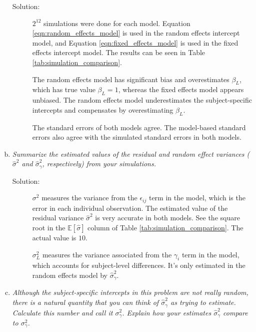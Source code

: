 \documentclass[11pt, letterpaper]{article}
\begin{document}
\begin{enumerate}[(a)]
  

  \begin{description}
  \item[Solution:] $2^{12}$ simulations were done for each model. Equation
    \ref{eqn:random_effects_model} is used in the random effects intercept
    model, and Equation \ref{eqn:fixed_effects_model} is used in the fixed
    effects intercept model. The results can be seen in Table
    \ref{tab:simulation_comparison}.

    The random effects model has significant bias and overestimates $\beta_L$,
    which has true value $\beta_L = 1$, whereas the fixed effects model appears
    unbiased. The random effects model underestimates the subject-specific
    intercepts and compensates by overestimating $\beta_L$.

    The standard errors of both models agree. The model-based standard errors
    also agree with the simulated standard errors in both models.   
  \end{description}
  

\item {\em  Summarize the estimated values of the residual and random effect variances ($\hat{\sigma}^2$ and $\hat{\sigma}^2_\gamma$, respectively) from your simulations.}

  \begin{description}
  \item[Solution:] $\sigma^2$ measures the variance from the $\epsilon_{ij}$
    term in the model, which is the error in each individual observation. The
    estimated value of the residual variance $\hat{\sigma}^2$ is very accurate
    in both models. See the square root in the
    $\mathbb{E}\left[\hat{\sigma}\right]$ column of
    Table \ref{tab:simulation_comparison}. The actual value is $10$.

    $\sigma^2_L$ measures the variance associated from the $\gamma_i$ term in
    the model, which accounts for subject-level differences. It's only estimated
    in the random effects model by $\hat{\sigma}^2_\gamma$.
  \end{description}
  
\item {\em  Although the subject-specific intercepts in this problem are not really random, there is a natural quantity that you can think of $\hat{\sigma}^2_\gamma$ as trying to estimate.  Calculate this number and call
    it $\sigma_\gamma^2$.  Explain how your estimates $\hat{\sigma}^2_\gamma$ compare to  $\sigma_\gamma^2$.}


\end{enumerate}
\end{document}
